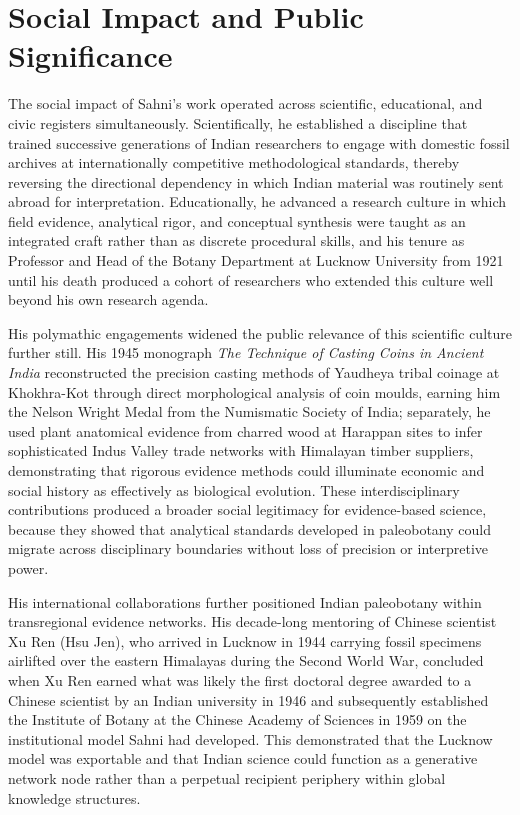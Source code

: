 \documentclass[10pt]{article}
\begin{document}
\section*{Social Impact and Public Significance}

The social impact of Sahni's work operated across scientific, educational, and civic registers simultaneously. Scientifically, he established a discipline that trained successive generations of Indian researchers to engage with domestic fossil archives at internationally competitive methodological standards, thereby reversing the directional dependency in which Indian material was routinely sent abroad for interpretation.\cite{from_lahore_lucknow} Educationally, he advanced a research culture in which field evidence, analytical rigor, and conceptual synthesis were taught as an integrated craft rather than as discrete procedural skills, and his tenure as Professor and Head of the Botany Department at Lucknow University from 1921 until his death produced a cohort of researchers who extended this culture well beyond his own research agenda.\cite{bsip_history}

His polymathic engagements widened the public relevance of this scientific culture further still. His 1945 monograph \textit{The Technique of Casting Coins in Ancient India} reconstructed the precision casting methods of Yaudheya tribal coinage at Khokhra-Kot through direct morphological analysis of coin moulds,\cite{palaeobot_bio} earning him the Nelson Wright Medal from the Numismatic Society of India; separately, he used plant anatomical evidence from charred wood at Harappan sites to infer sophisticated Indus Valley trade networks with Himalayan timber suppliers,\cite{wiki_birbal} demonstrating that rigorous evidence methods could illuminate economic and social history as effectively as biological evolution. These interdisciplinary contributions produced a broader social legitimacy for evidence-based science, because they showed that analytical standards developed in paleobotany could migrate across disciplinary boundaries without loss of precision or interpretive power.

His international collaborations further positioned Indian paleobotany within transregional evidence networks. His decade-long mentoring of Chinese scientist Xu Ren (Hsu Jen), who arrived in Lucknow in 1944 carrying fossil specimens airlifted over the eastern Himalayas during the Second World War,\cite{trans_himalayan_article} concluded when Xu Ren earned what was likely the first doctoral degree awarded to a Chinese scientist by an Indian university in 1946\cite{trans_himalayan_pdf} and subsequently established the Institute of Botany at the Chinese Academy of Sciences in 1959 on the institutional model Sahni had developed. This demonstrated that the Lucknow model was exportable and that Indian science could function as a generative network node rather than a perpetual recipient periphery within global knowledge structures.\cite{trans_himalayan_pdf}
\end{document}
